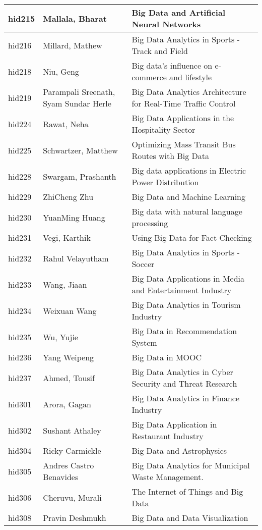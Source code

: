\documentclass[12pt]{book}
\begin{document}
\begin{footnotesize}
\begin{longtable}{|p{1cm}p{5cm}p{9cm}|}
\hline
hid215 & Mallala, Bharat & Big Data and Artificial Neural Networks  \\
\hline
hid216 & Millard, Mathew & Big Data Analytics in Sports - Track and Field  \\
\hline
hid218 & Niu, Geng & Big data's influence on e-commerce and lifestyle  \\
\hline
hid219 & Parampali Sreenath, Syam Sundar Herle & Big Data Analytics Architecture for Real-Time Traffic Control  \\
\hline
hid224 & Rawat, Neha & Big Data Applications in the Hospitality Sector  \\
\hline
hid225 & Schwartzer, Matthew & Optimizing Mass Transit Bus Routes with Big Data  \\
\hline
hid228 & Swargam, Prashanth & Big data applications in Electric Power Distribution  \\
\hline
hid229 & ZhiCheng Zhu & Big Data and Machine Learning  \\
\hline
hid230 & YuanMing Huang & Big data with natural language processing  \\
\hline
hid231 & Vegi, Karthik & Using Big Data for Fact Checking  \\
\hline
hid232 & Rahul Velayutham & Big Data Analytics in Sports - Soccer  \\
\hline
hid233 & Wang, Jiaan & Big Data Applications in Media and Entertainment Industry  \\
\hline
hid234 & Weixuan Wang & Big Data Analytics in Tourism Industry  \\
\hline
hid235 & Wu, Yujie & Big Data in Recommendation System  \\
\hline
hid236 & Yang Weipeng & Big Data in MOOC  \\
\hline
hid237 & Ahmed, Tousif & Big Data Analytics in Cyber Security and Threat Research  \\
\hline
hid301 & Arora, Gagan & Big Data Analytics in Finance Industry  \\
\hline
hid302 & Sushant Athaley & Big Data Application in Restaurant Industry  \\
\hline
hid304 & Ricky Carmickle & Big Data and Astrophysics  \\
\hline
hid305 & Andres Castro Benavides & Big Data Analytics for Municipal Waste Management.  \\
\hline
hid306 & Cheruvu, Murali & The Internet of Things and Big Data  \\
\hline
hid308 & Pravin Deshmukh & Big Data and Data Visualization  \\

\end{longtable}
\end{footnotesize}
\end{document}
